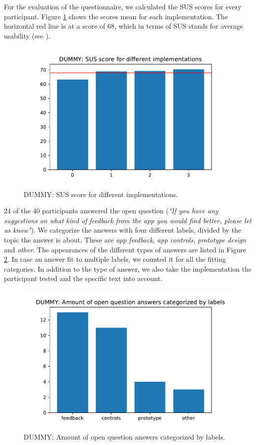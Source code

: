 \documentclass[11pt, a4paper]{article}
\begin{document}
			For the evaluation of the questionnaire, we calculated the \ac{SUS} scores for every participant. Figure \ref{fig:sus} shows the scores mean for each implementation. The horizontal red line is at a score of 68, which in terms of \ac{SUS} stands for average usability (see ).

			\begin{figure}[H]
				\centering
				\includegraphics[width=.49\textwidth]{img/plot/plot_sus.pdf}
				\caption{DUMMY: SUS score for different implementations.}
				\label{fig:sus}
			\end{figure}

			24 of the 40 participants answered the open question (\emph{"If you have any suggestions on what kind of feedback from the app you would find better, please let us know"}). We categorize the answers with four different labels, divided by the topic the answer is about. These are \emph{app feedback}, \emph{app controls}, \emph{prototype design} and \emph{other}. The appearances of the different types of answers are listed in Figure \ref{fig:tags}. In case an answer fit to multiple labels, we counted it for all the fitting categories. In addition to the type of answer, we also take the implementation the participant tested and the specific text into account. 

			\begin{figure}[H]
				\centering
				\includegraphics[width=.49\textwidth]{img/plot/plot_tags.pdf}
				\caption{DUMMY: Amount of open question answers categorized by labels.}
				\label{fig:tags}
			\end{figure}
\end{document}
